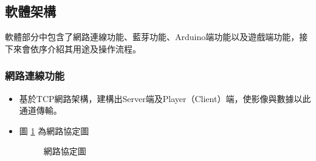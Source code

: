 \documentclass[12pt]{article}  %
\theoremstyle{plain}
\begin{document}
\subsection{軟體架構}
軟體部分中包含了網路連線功能、藍芽功能、Arduino端功能以及遊戲端功能，接下來會依序介紹其用途及操作流程。

\subsubsection{網路連線功能}
\begin{itemize}
\item 基於TCP網路架構，建構出Server端及Player（Client）端，使影像與數據以此通道傳輸。

\item 圖 \ref{網路協定圖} 為網路協定圖
\begin{figure}[htbp]
\quad
{}
\quad
{}
\caption{網路協定圖} \label{網路協定圖}
\end{figure}
\newpage


\end{itemize}
\end{document}
